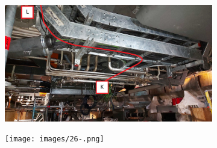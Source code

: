 \begin{figure}
  \centering
  \begin{subfigure}{0.40\textwidth}
    \centering
    \includegraphics[width=\textwidth]{images/25.jpg}
  \end{subfigure}
  \hfill
  \begin{subfigure}{0.40\textwidth}
    \centering
    \texttt{[image: images/26-.png]}
  \end{subfigure}
\end{figure}

